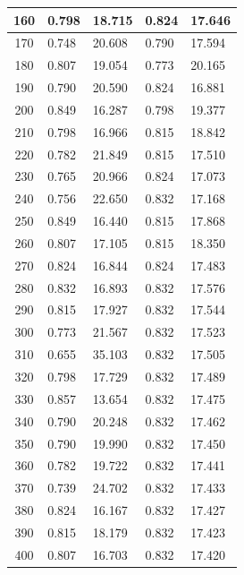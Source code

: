 \begin{longtable}{|c|l|l|l|l|}
        160 & 0.798 & 18.715 & 0.824 & 17.646 \\ \hline
        170 & 0.748 & 20.608 & 0.790 & 17.594 \\ \hline
        180 & 0.807 & 19.054 & 0.773 & 20.165 \\ \hline
        190 & 0.790 & 20.590 & 0.824 & 16.881 \\ \hline
        200 & 0.849 & 16.287 & 0.798 & 19.377 \\ \hline
        210 & 0.798 & 16.966 & 0.815 & 18.842 \\ \hline
        220 & 0.782 & 21.849 & 0.815 & 17.510 \\ \hline
        230 & 0.765 & 20.966 & 0.824 & 17.073 \\ \hline
        240 & 0.756 & 22.650 & 0.832 & 17.168 \\ \hline
        250 & 0.849 & 16.440 & 0.815 & 17.868 \\ \hline
        260 & 0.807 & 17.105 & 0.815 & 18.350 \\ \hline
        270 & 0.824 & 16.844 & 0.824 & 17.483 \\ \hline
        280 & 0.832 & 16.893 & 0.832 & 17.576 \\ \hline
        290 & 0.815 & 17.927 & 0.832 & 17.544 \\ \hline
        300 & 0.773 & 21.567 & 0.832 & 17.523 \\ \hline
        310 & 0.655 & 35.103 & 0.832 & 17.505 \\ \hline
        320 & 0.798 & 17.729 & 0.832 & 17.489 \\ \hline
        330 & 0.857 & 13.654 & 0.832 & 17.475 \\ \hline
        340 & 0.790 & 20.248 & 0.832 & 17.462 \\ \hline
        350 & 0.790 & 19.990 & 0.832 & 17.450 \\ \hline
        360 & 0.782 & 19.722 & 0.832 & 17.441 \\ \hline
        370 & 0.739 & 24.702 & 0.832 & 17.433 \\ \hline
        380 & 0.824 & 16.167 & 0.832 & 17.427 \\ \hline
        390 & 0.815 & 18.179 & 0.832 & 17.423 \\ \hline
        400 & 0.807 & 16.703 & 0.832 & 17.420 \\
    \end{longtable}

